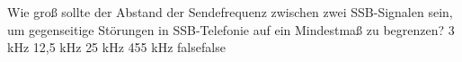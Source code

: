     {Wie groß sollte der Abstand der Sendefrequenz zwischen zwei SSB-Signalen sein, um gegenseitige Störungen in SSB-Telefonie auf ein Mindestmaß zu begrenzen?}
    {3 kHz}
    {12,5 kHz}
    {25 kHz}
    {455 kHz}
    {false}{false}